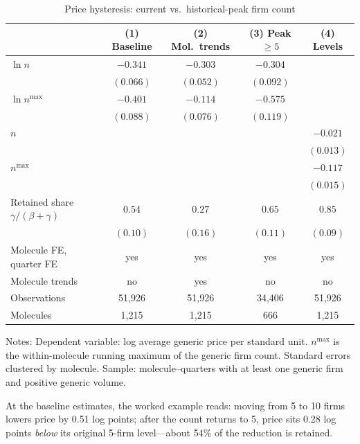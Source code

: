 \documentclass[11pt]{article}
\begin{document}
\begin{table}[htbp]
\centering
\caption{Price hysteresis: current vs.\ historical-peak firm count}
\label{tab:hysteresis}
\begin{tabular}{lcccc}
\toprule
 & (1) Baseline & (2) Mol.\ trends & (3) Peak $\geq 5$ & (4) Levels \\
\midrule
$\ln n$            & $-0.341$ & $-0.303$ & $-0.304$ &          \\
                   & $(0.066)$ & $(0.052)$ & $(0.092)$ &        \\
$\ln n^{\max}$     & $-0.401$ & $-0.114$ & $-0.575$ &          \\
                   & $(0.088)$ & $(0.076)$ & $(0.119)$ &        \\
$n$                &          &          &          & $-0.021$ \\
                   &          &          &          & $(0.013)$ \\
$n^{\max}$         &          &          &          & $-0.117$ \\
                   &          &          &          & $(0.015)$ \\
\addlinespace
Retained share $\gamma/(\beta{+}\gamma)$
                   & $0.54$   & $0.27$   & $0.65$   & $0.85$   \\
                   & $(0.10)$ & $(0.16)$ & $(0.11)$ & $(0.09)$ \\
\addlinespace
Molecule FE, quarter FE & yes & yes & yes & yes \\
Molecule trends    & no  & yes & no  & no  \\
Observations       & 51{,}926 & 51{,}926 & 34{,}406 & 51{,}926 \\
Molecules          & 1{,}215  & 1{,}215  & 666      & 1{,}215  \\
\bottomrule
\end{tabular}
\par\smallskip
\parbox{0.92\textwidth}{\footnotesize Notes: Dependent variable: log average
generic price per standard unit. $n^{\max}$ is the within-molecule running
maximum of the generic firm count. Standard errors clustered by molecule.
Sample: molecule--quarters with at least one generic firm and positive
generic volume.}
\end{table}

At the baseline estimates, the worked example reads: moving from 5 to 10
firms lowers price by 0.51 log points; after the count returns to 5, price
sits 0.28 log points \emph{below} its original 5-firm level---about 54\% of
the reduction is retained.
\end{document}
